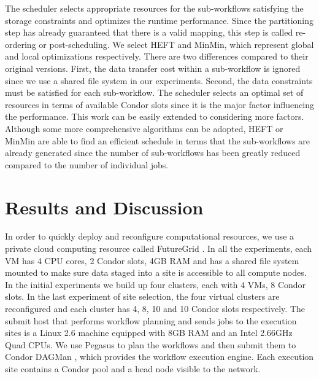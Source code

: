 The scheduler selects appropriate resources for the sub-workflows satisfying the storage constraints and optimizes the runtime performance. Since the partitioning step has already guaranteed that there is a valid mapping, this step is called re-ordering or post-scheduling. We select HEFT\cite{Topcuoglu2002} and MinMin\cite{Blythe2005}, which represent global and local optimizations respectively. There are two differences compared to their original versions. First, the data transfer cost within a sub-workflow is ignored since we use a shared file system in our experiments. Second, the data constraints must be satisfied for each sub-workflow. 
The scheduler selects an optimal set of resources in terms of available Condor slots since it is the major factor influencing the performance. This work can be easily extended to considering more factors. Although some more comprehensive algorithms can be adopted, HEFT or MinMin are able to find an efficient schedule in terms that the sub-workflows are already generated since the number of sub-workflows has been greatly reduced compared to the number of individual jobs.

\section{Results and Discussion}
In order to quickly deploy and reconfigure computational resources, we use a private cloud computing resource called FutureGrid \cite{Fox2013FutureGrid}. In all the experiments, each VM has 4 CPU cores, 2 Condor slots, 4GB RAM and has a shared file system mounted to make sure data staged into a site is accessible to all compute nodes. In the initial experiments we build up four clusters, each with 4 VMs, 8 Condor slots. In the last experiment of site selection, the four virtual clusters are reconfigured and each cluster has 4, 8, 10 and 10 Condor slots respectively. The submit host that performs workflow planning and sends jobs to the execution sites is a Linux 2.6 machine equipped with 8GB RAM and an Intel 2.66GHz Quad CPUs. We use Pegasus to plan the workflows and then submit them to Condor DAGMan \cite{DAGMan}, which provides the workflow execution engine. Each execution site contains a Condor pool and a head node visible to the network. 

